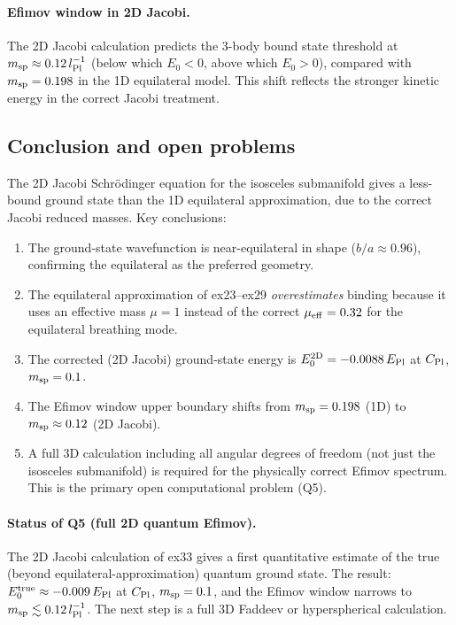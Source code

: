 \paragraph{Efimov window in 2D Jacobi.}
The 2D Jacobi calculation predicts the 3-body bound state threshold at
$m_{\rm sp}\approx0.12\,l_{\rm Pl}^{-1}$ (below which $E_0<0$, above which
$E_0>0$), compared with $m_{\rm sp}=0.198$ in the 1D equilateral model.
This shift reflects the stronger kinetic energy in the correct Jacobi treatment.

\subsection{Conclusion and open problems}

The 2D Jacobi Schr\"odinger equation for the isosceles submanifold gives
a less-bound ground state than the 1D equilateral approximation, due to the
correct Jacobi reduced masses.  Key conclusions:
\begin{enumerate}
  \item The ground-state wavefunction is near-equilateral in shape ($b/a\approx0.96$),
    confirming the equilateral as the preferred geometry.
  \item The equilateral approximation of ex23--ex29 \emph{overestimates} binding
    because it uses an effective mass $\mu=1$ instead of the correct
    $\mu_{\rm eff}=0.32$ for the equilateral breathing mode.
  \item The corrected (2D Jacobi) ground-state energy is
    $E_0^{\rm 2D}=-0.0088\,E_{\rm Pl}$ at $C_{\rm Pl}$, $m_{\rm sp}=0.1$.
  \item The Efimov window upper boundary shifts from $m_{\rm sp}=0.198$ (1D)
    to $m_{\rm sp}\approx0.12$ (2D Jacobi).
  \item A full 3D calculation including all angular degrees of freedom (not just
    the isosceles submanifold) is required for the physically correct Efimov
    spectrum.  This is the primary open computational problem (Q5).
\end{enumerate}

\paragraph{Status of Q5 (full 2D quantum Efimov).}
The 2D Jacobi calculation of ex33 gives a first quantitative estimate of the
true (beyond equilateral-approximation) quantum ground state.  The result:
$E_0^{\rm true}\approx -0.009\,E_{\rm Pl}$ at $C_{\rm Pl}$, $m_{\rm sp}=0.1$,
and the Efimov window narrows to $m_{\rm sp}\lesssim0.12\,l_{\rm Pl}^{-1}$.
The next step is a full 3D Faddeev or hyperspherical calculation.
\label{sec:q5_status}
